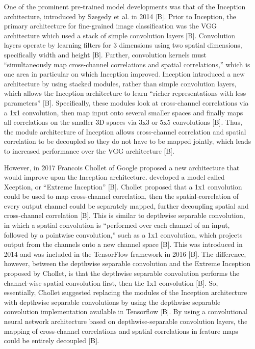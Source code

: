 \documentclass[12pt]{report}
\begin{document}
\par One of the prominent pre-trained model developments was that of the Inception architecture, introduced by Szegedy et al. in 2014 [B]. Prior to Inception, the primary architecture for fine-grained image classification was the VGG architecture which used a stack of simple convolution layers [B]. Convolution layers operate by learning filters for 3 dimensions using two spatial dimensions, specifically width and height [B]. Further, convolution kernels must “simultaneously map cross-channel correlations and spatial correlations,” which is one area in particular on which Inception improved. Inception introduced a new architecture by using stacked modules, rather than simple convolution layers, which allows the Inception architecture to learn “richer representations with less parameters” [B]. Specifically, these modules look at cross-channel correlations via a 1x1 convolution, then map input onto several smaller spaces and finally maps all correlations on the smaller 3D spaces via 3x3 or 5x5 convolutions [B]. Thus, the module architecture of Inception allows cross-channel correlation and spatial correlation to be decoupled so they do not have to be mapped jointly, which leads to increased performance over the VGG architecture [B].
\par However, in 2017 Francois Chollet of Google proposed a new architecture that would improve upon the Inception architecture. developed a model called Xception, or “Extreme Inception” [B]. Chollet proposed that a 1x1 convolution could be used to map cross-channel correlation, then the spatial-correlation of every output channel could be separately mapped, further decoupling spatial and cross-channel correlation [B]. This is similar to depthwise separable convolution, in which a spatial convolution is “performed over each channel of an input, followed by a pointwise convolution,” such as a 1x1 convolution, which projects output from the channels onto a new channel space [B]. This was introduced in 2014 and was included in the TensorFlow framework in 2016 [B].  The difference, however, between the depthwise separable convolution and the Extreme Inception proposed by Chollet, is that the depthwise separable convolution performs the channel-wise spatial convolution first, then the 1x1 convolution [B]. So, essentially, Chollet suggested replacing the modules of the Inception architecture with depthwise separable convolutions by using the depthwise separable convolution implementation available in Tensorflow [B]. By using a convolutional neural network architecture based on depthwise-separable convolution layers, the mapping of cross-channel correlations and spatial correlations in feature maps could be entirely decoupled [B].
\end{document}
